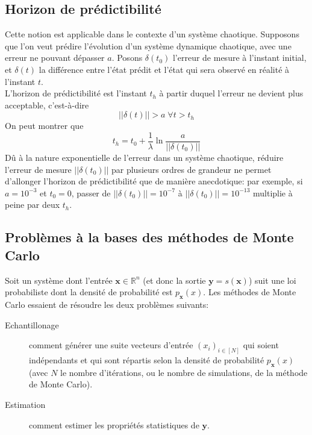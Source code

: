 \documentclass[a4paper]{article}
\begin{document}
\subsection{Horizon de prédictibilité}
Cette notion est applicable dans le contexte d'un système chaotique. Supposons
que l'on veut prédire l'évolution d'un système dynamique chaotique, avec une
erreur ne pouvant dépasser \(a\). Posons \(\delta(t_0)\) l'erreur de mesure à
l'instant initial, et \(\delta(t)\) la différence entre l'état prédit et l'état
qui sera observé en réalité à l'instant \(t\).\\
L'horizon de prédictibilité est l'instant \(t_h\) à partir duquel l'erreur ne
devient plus acceptable, c'est-à-dire \[||\delta(t)||>a\;\forall t>t_h\]
On peut montrer que
\[t_h=t_0+\frac{1}{\lambda}\ln\frac{a}{||\delta(t_0)||}\]
Dû à la nature exponentielle de l'erreur dans un système chaotique, réduire
l'erreur de mesure \(||\delta(t_0)||\) par plusieurs ordres de grandeur ne
permet d'allonger l'horizon de prédictibilité que de manière anecdotique: par
exemple, si \(a=10^{-3}\) et \(t_0=0\), passer de \(||\delta(t_0)||=10^{-7}\)
à \(||\delta(t_0)||=10^{-13}\) multiplie à peine par deux \(t_h\).

\subsection{Problèmes à la bases des méthodes de Monte Carlo}
Soit un système dont l'entrée \(\bm x\in\mathbb R^n\) (et donc la sortie
\(\bm y=s(\bm x)\)) suit une loi probabiliste dont la densité de
probabilité est \(p_{\bm x}(x)\). Les méthodes de Monte Carlo essaient de
résoudre les deux problèmes suivants:
\begin{description}
	\item[Echantillonage] comment générer une suite vecteurs d'entrée
		\((x_i)_{i\in[N]}\) qui soient indépendants et qui sont répartis selon
		la densité de probabilité \(p_{\bm x}(x)\) (avec \(N\) le nombre
		d'itérations, ou le nombre de simulations, de la méthode de Monte
		Carlo).
	\item[Estimation] comment estimer les propriétés statistiques de
		\(\bm y\).
\end{description}
\end{document}
